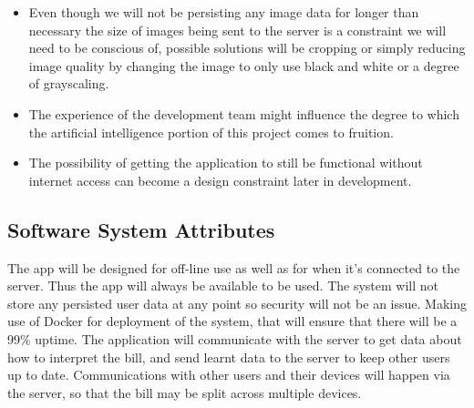 \documentclass[12pt,a4paper]{article}
\begin{document}
		\begin{itemize}
			\item Even though we will not be persisting any image data for longer than necessary the size of images being sent to the server is a constraint we will need to be conscious of, possible solutions will be cropping or simply reducing image quality by changing the image to only use black and white or a degree of grayscaling.
			\item The experience of the development team might influence the degree to which the artificial intelligence portion of this project comes to fruition.
			\item The possibility of getting the application to still be functional without internet access can become a design constraint later in development.
		\end{itemize}

	\subsection{Software System Attributes}
   		The app will be designed for off-line use as well as for when it's connected to the server. Thus the app will always be available to be used. The system will not store any persisted user data at any point so security will not be an issue. Making use of Docker for  deployment of the system, that will ensure that there will be a 99\% uptime. The application will communicate with the server to get data about how to interpret the bill, and send learnt data to the server to keep other users up to date. Communications with other users and their devices will happen via the server, so that the bill may be split across multiple devices.
\end{document}
